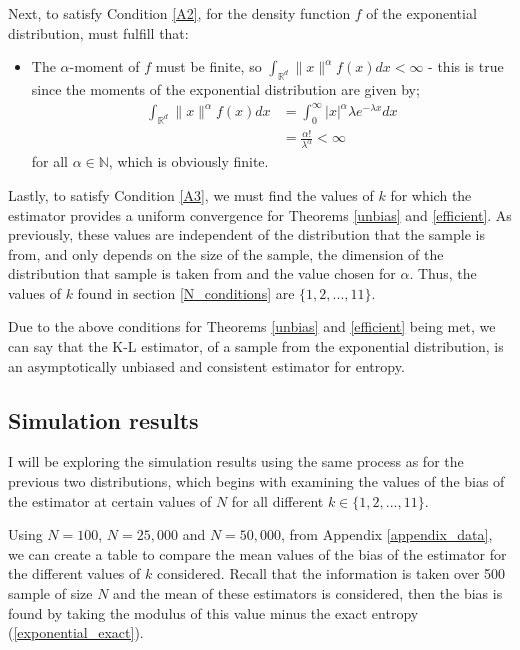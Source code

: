 \documentclass[12pt]{report}
\begin{document}
Next, to satisfy Condition \ref{A2}, for the density function $f$ of the exponential distribution, must fulfill that:
\begin{itemize}
\item The $\alpha$-moment of $f$ must be finite, so $\int_{\mathbb{R}^{d}} \| x \|^{\alpha} f(x) dx < \infty$ - this is true since the moments of the exponential distribution are given by;
\begin{align*}
\int_{\mathbb{R}^{d}} \| x \|^{\alpha} f(x) dx &= \int_{0}^{\infty} | x |^{\alpha} \lambda e^{-\lambda x} dx\\
&= \frac{\alpha !}{\lambda ^{\alpha}} < \infty
\end{align*}
for all $\alpha \in \mathbb{N}$, which is obviously finite.
\end{itemize}

Lastly, to satisfy Condition \ref{A3}, we must find the values of $k$ for which the estimator provides a uniform convergence for Theorems \ref{unbias} and \ref{efficient}. As previously, these values are independent of the distribution that the sample is from, and only depends on the size of the sample, the dimension of the distribution that sample is taken from and the value chosen for $\alpha$. Thus, the values of $k$ found in section \ref{N_conditions} are $\{1, 2, ..., 11\}$.

Due to the above conditions for Theorems \ref{unbias} and \ref{efficient} being met, we can say that the K-L estimator, of a sample from the exponential distribution, is an asymptotically unbiased and consistent estimator for entropy. 



\subsection{Simulation results} \label{Expo_results}

I will be exploring the simulation results using the same process as for the previous two distributions, which begins with examining the values of the bias of the estimator at certain values of $N$ for all different $k \in \{1, 2, ..., 11\}$.

Using $N=100$, $N=25,000$ and $N=50,000$, from Appendix \ref{appendix_data}, we can create a table to compare the mean values of the bias of the estimator for the different values of $k$ considered. Recall that the information is taken over 500 sample of size $N$ and the mean of these estimators is considered, then the bias is found by taking the modulus of this value minus the exact entropy (\ref{exponential_exact}).
\end{document}
